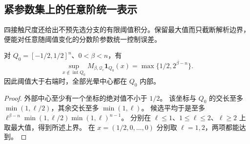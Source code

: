 
\subsection{紧参数集上的任意阶统一表示}

四接触尺度还给出不预先选分支的有限阈值积分。保留最大值而只截断解析边界，
便能对任意随阈值变化的分数阶参数统一控制误差。

\begin{lemma}[方体外部中心的精确顶层]\label{fix:outside-localization}
对 $Q_0=[-1/2,1/2]^n$、$0<\beta<n$，有
\[
 \sup_{x\notin\operatorname{int}Q_0}M_{\beta,\mathcal Q_c}\mathbf1_{Q_0}(x)
 =\max\{1/2,2^{\beta-n}\}.
\]
因此阈值大于右端时，全部光晕中心都在 $Q_0$ 内部。
\end{lemma}
\begin{proof}
外部中心至少有一个坐标的绝对值不小于 $1/2$。
该坐标与 $Q_0$ 的交长至多 $\min(1,\ell/2)$，其余交长至多 $\min(1,\ell)$。
候选平均于是至多
$\ell^{\beta-n}\min(1,\ell/2)\min(1,\ell)^{n-1}$。
分别在 $\ell\le1$、$1\le\ell\le2$、$\ell\ge2$ 上取最大值，得到所述上界。
在 $x=(1/2,0,\ldots,0)$ 分别取 $\ell=1,2$，两项都能达到。
\end{proof}

